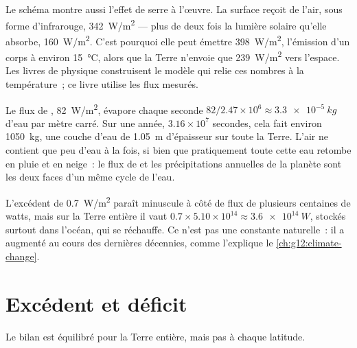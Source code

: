 Le schéma montre aussi l'effet de serre à l'œuvre. La surface reçoit de
l'air, sous forme d'infrarouge, \qty{342}{W/m^2} --- plus de deux fois la
lumière solaire qu'elle absorbe, \qty{160}{W/m^2}. C'est pourquoi elle peut
émettre \qty{398}{W/m^2}, l'émission d'un corps à environ
\qty{15}{\degreeCelsius}, alors que la Terre n'envoie que \qty{239}{W/m^2}
vers l'espace. Les livres de physique construisent le modèle qui relie ces
nombres à la température~; ce livre utilise les flux mesurés.

\begin{example}\label{ex:g10:earth-energy-budget:evaporation}
Le flux de , \qty{82}{W/m^2}, évapore chaque seconde
$82/2.47\times
10^6 \approx \qty{3.3e-5}{kg}$ d'eau par mètre carré. Sur une
année, $3.16\times10^7$ secondes, cela fait environ \qty{1050}{kg}, une
couche d'eau de \qty{1.05}{m} d'épaisseur sur toute la Terre. L'air ne
contient que peu d'eau à la fois, si bien que pratiquement toute cette eau
retombe en pluie et en neige~: le flux de  et les
précipitations annuelles de la planète sont les deux faces d'un même cycle
de l'eau.
\end{example}

\begin{remark}[Le déséquilibre]\label{rem:g10:earth-energy-budget:imbalance}
L'excédent de \qty{0.7}{W/m^2} paraît minuscule à côté de flux de plusieurs
centaines de watts, mais sur la Terre entière il vaut
$0.7 \times 5.10\times10^{14} \approx
\qty{3.6e14}{W}$, stockés surtout dans
l'océan, qui se réchauffe. Ce n'est pas une constante naturelle~: il a
augmenté au cours des dernières décennies, comme l'explique le
\cref{ch:g12:climate-change}.
\end{remark}

\section{Excédent et déficit}

Le bilan est équilibré pour la Terre entière, mais pas à chaque latitude.

